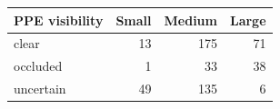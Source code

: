\begin{tabular}{lrrr}
\toprule
PPE visibility & Small & Medium & Large \\
\midrule
clear & 13 & 175 & 71 \\
occluded & 1 & 33 & 38 \\
uncertain & 49 & 135 & 6 \\
\bottomrule
\end{tabular}
